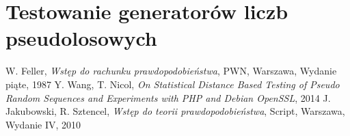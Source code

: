 \documentclass[a4paper,11pt,oneside]{book}
\begin{document}
\chapter{Testowanie generatorów liczb pseudolosowych}
\label{czescTest}

\begin{thebibliography}{99}
    W. Feller, \emph{Wstęp do rachunku prawdopodobieństwa}, PWN, Warszawa, Wydanie piąte, 1987
    Y. Wang, T. Nicol, \emph{On Statistical Distance Based Testing of Pseudo Random Sequences and Experiments with PHP and Debian OpenSSL}, 2014
    J. Jakubowski, R. Sztencel, \emph{Wstęp do teorii prawdopodobieństwa}, Script, Warszawa, Wydanie IV, 2010

\end{thebibliography}
\end{document}
